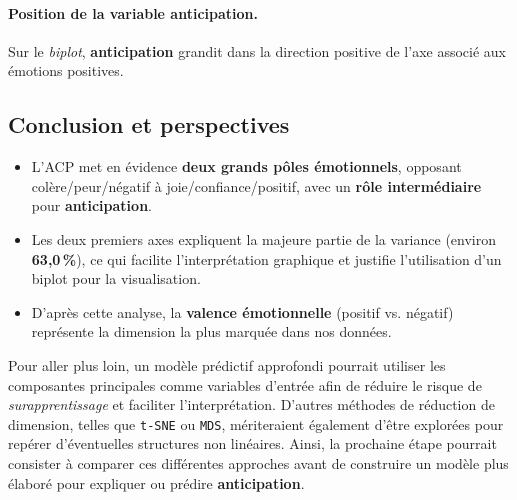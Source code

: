\documentclass[12pt,a4paper]{article}
\begin{document}
\paragraph{Position de la variable \textbf{anticipation}.}
Sur le \textit{biplot}, \textbf{anticipation} grandit dans la direction positive de l’axe
associé aux émotions positives.


\subsection{Conclusion et perspectives}
\begin{itemize}
	\item L’ACP met en évidence \textbf{deux grands pôles émotionnels}, 
	opposant colère/peur/négatif à joie/confiance/positif, 
	avec un \textbf{rôle intermédiaire} pour \textbf{anticipation}.
	\item Les deux premiers axes expliquent la majeure partie de la variance 
	(environ \textbf{63,0\,\%}), ce qui facilite l’interprétation graphique et 
	justifie l’utilisation d’un biplot pour la visualisation.
	\item D’après cette analyse, la \textbf{valence émotionnelle} 
	(positif vs. négatif) représente la dimension la plus marquée dans nos données.
\end{itemize}

Pour aller plus loin, un modèle prédictif approfondi pourrait utiliser 
les composantes principales comme variables d’entrée afin de réduire 
le risque de \textit{surapprentissage} et faciliter l’interprétation. 
D’autres méthodes de réduction de dimension, telles que 
\texttt{t-SNE} ou \texttt{MDS}, mériteraient également d’être explorées 
pour repérer d’éventuelles structures non linéaires. 
Ainsi, la prochaine étape pourrait consister à comparer ces différentes approches 
avant de construire un modèle plus élaboré pour expliquer ou prédire 
\textbf{anticipation}.

	

	
\end{document}
